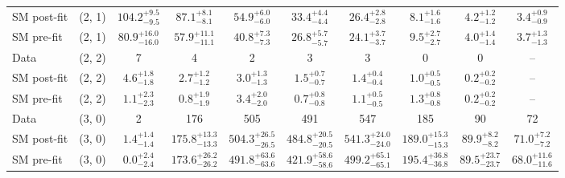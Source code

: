 {\begin{table}[h!]
{\begin{tabular}{lccccccccc}
    SM post-fit & (2, 1)           & $104.2^{+ 9.5 }_{- 9.5 }$     & $87.1^{+ 8.1 }_{- 8.1 }$      & $54.9^{+ 6.0 }_{- 6.0 }$    & $33.4^{+ 4.4 }_{- 4.4 }$    & $26.4^{+ 2.8 }_{- 2.8 }$    & $8.1^{+ 1.6 }_{- 1.6 }$     & $4.2^{+ 1.2 }_{- 1.2 }$    & $3.4^{+ 0.9 }_{- 0.9 }$    \\[0.5ex] 
    SM pre-fit  & (2, 1)           & $80.9^{+ 16.0 }_{- 16.0 }$    & $57.9^{+ 11.1 }_{- 11.1 }$    & $40.8^{+ 7.3 }_{- 7.3 }$    & $26.8^{+ 5.7 }_{- 5.7 }$    & $24.1^{+ 3.7 }_{- 3.7 }$    & $9.5^{+ 2.7 }_{- 2.7 }$     & $4.0^{+ 1.4 }_{- 1.4 }$    & $3.7^{+ 1.3 }_{- 1.3 }$    \\[0.5ex] 
    Data        & (2, 2)           & 7                             & 4                             & 2                           & 3                           & 3                           & 0                           & 0                          & --                         \\[0.5ex] 
    SM post-fit & (2, 2)           & $4.6^{+ 1.8 }_{- 1.8 }$       & $2.7^{+ 1.2 }_{- 1.2 }$       & $3.0^{+ 1.3 }_{- 1.3 }$     & $1.5^{+ 0.7 }_{- 0.7 }$     & $1.4^{+ 0.4 }_{- 0.4 }$     & $1.0^{+ 0.5 }_{- 0.5 }$     & $0.2^{+ 0.2 }_{- 0.2 }$    & --                         \\[0.5ex] 
    SM pre-fit  & (2, 2)           & $1.1^{+ 2.3 }_{- 2.3 }$       & $0.8^{+ 1.9 }_{- 1.9 }$       & $3.4^{+ 2.0 }_{- 2.0 }$     & $0.7^{+ 0.8 }_{- 0.8 }$     & $1.1^{+ 0.5 }_{- 0.5 }$     & $1.3^{+ 0.8 }_{- 0.8 }$     & $0.2^{+ 0.2 }_{- 0.2 }$    & --                         \\[0.5ex] 
    Data        & (3, 0)           & 2                             & 176                           & 505                         & 491                         & 547                         & 185                         & 90                         & 72                         \\[0.5ex] 
    SM post-fit & (3, 0)           & $1.4^{+ 1.4 }_{- 1.4 }$       & $175.8^{+ 13.3 }_{- 13.3 }$   & $504.3^{+ 26.5 }_{- 26.5 }$ & $484.8^{+ 20.5 }_{- 20.5 }$ & $541.3^{+ 24.0 }_{- 24.0 }$ & $189.0^{+ 15.3 }_{- 15.3 }$ & $89.9^{+ 8.2 }_{- 8.2 }$   & $71.0^{+ 7.2 }_{- 7.2 }$   \\[0.5ex] 
    SM pre-fit  & (3, 0)           & $0.0^{+ 2.4 }_{- 2.4 }$       & $173.6^{+ 26.2 }_{- 26.2 }$   & $491.8^{+ 63.6 }_{- 63.6 }$ & $421.9^{+ 58.6 }_{- 58.6 }$ & $499.2^{+ 65.1 }_{- 65.1 }$ & $195.4^{+ 36.8 }_{- 36.8 }$ & $89.5^{+ 23.7 }_{- 23.7 }$ & $68.0^{+ 11.6 }_{- 11.6 }$ \\[0.5ex] 

\end{tabular}}
\end{table}}
